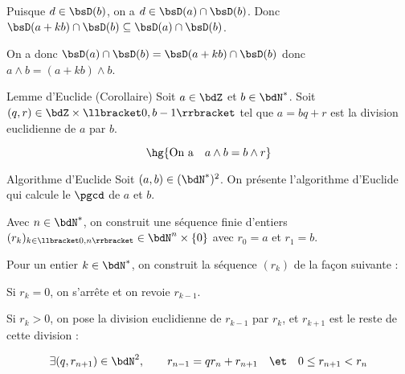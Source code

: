 \documentclass[a4paper,french,bookmarks]{article}
\begin{document}
\begin{enumerate}
{\begin{enumerate}
             Puisque $d \in \bsD(b)$, on a $d \in \bsD(a) \cap \bsD(b)$. Donc $\bsD(a + kb) \cap \bsD(b) \subseteq \bsD(a) \cap \bsD(b)$.
             
        \end{enumerate}
        
       On a donc $\bsD(a) \cap \bsD(b) = \bsD(a + kb) \cap \bsD(b)$ donc $a \wedge b = (a + kb) \wedge b$. 
    }

    \begin{lemma*}{Lemme d'Euclide (Corollaire)}{}
        Soit $a \in \bdZ$ et $b \in \bdN^*$. Soit $(q, r) \in \bdZ\times\llbracket0, b-1\rrbracket$ tel que  $a = bq + r$ est la division euclidienne de $a$ par $b$. 
        
        \[ \hg{\text{On a} \quad a \land b = b \land r}\]
    \end{lemma*}

    
    \begin{form}{Algorithme d'Euclide}{}
        Soit $(a, b) \in (\bdN^*)^2$. On présente l'algorithme d'Euclide qui calcule le $\pgcd$ de $a$ et $b$.
        
        \begin{enumerate}
            \ithand Avec $n \in \bdN^*$, on construit une séquence finie d'entiers $(r_k)_{k \in \llbracket0, n\rrbracket} \in \bdN^n\times\{0\}$ avec $r_0 = a$ et $r_1 = b$.
            
            \ithand Pour un entier $k \in \bdN^*$, on construit la séquence $(r_k)$ de la façon suivante :
            
            \begin{enumerate}
                \itstar Si $r_k = 0$, on s'arrête et on revoie $r_{k-1}$.
                
                \itstar Si $r_k > 0$, on pose la division euclidienne de $r_{k-1}$ par $r_k$, et $r_{k+1}$ est le reste de cette division :
                
                \[ \exists (q, r_{n+1}) \in \bdN^2, \qquad r_{n-1} = qr_n + r_{n+1} \quad\et\quad 0 \leq r_{n+1} < r_n\]
            \end{enumerate}
            

\end{enumerate}
\end{form}
\end{enumerate}
\end{document}
